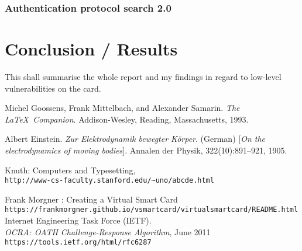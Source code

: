\documentclass[bsc,frontabs,twoside,singlespacing,parskip,deptreport]{infthesis}     %
\begin{document}
\subsection{Authentication protocol search 2.0}




\chapter{Conclusion / Results}

This shall summarise the whole report and my findings in regard to low-level vulnerabilities on the card.




%
\begin{thebibliography}{}

Michel Goossens, Frank Mittelbach, and Alexander Samarin. 
\textit{The \LaTeX\ Companion}. 
Addison-Wesley, Reading, Massachusetts, 1993.
 
Albert Einstein. 
\textit{Zur Elektrodynamik bewegter K{\"o}rper}. (German) 
[\textit{On the electrodynamics of moving bodies}]. 
Annalen der Physik, 322(10):891–921, 1905.
 
Knuth: Computers and Typesetting,
\\\texttt{http://www-cs-faculty.stanford.edu/\~{}uno/abcde.html}

Frank Morgner : Creating a Virtual Smart Card\\
\texttt{https://frankmorgner.github.io/vsmartcard/virtualsmartcard/README.html}\\

Internet Engineering Task Force (IETF).\\
\textit{OCRA: OATH Challenge-Response Algorithm}, June 2011\\
\texttt{https://tools.ietf.org/html/rfc6287}


\end{thebibliography}
\end{document}
